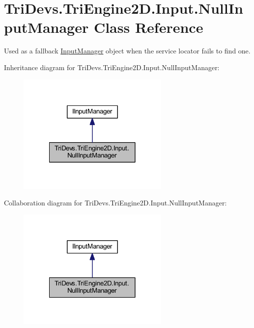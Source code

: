 \hypertarget{class_tri_devs_1_1_tri_engine2_d_1_1_input_1_1_null_input_manager}{\section{Tri\-Devs.\-Tri\-Engine2\-D.\-Input.\-Null\-Input\-Manager Class Reference}
\label{class_tri_devs_1_1_tri_engine2_d_1_1_input_1_1_null_input_manager}
}


Used as a fallback \hyperlink{class_tri_devs_1_1_tri_engine2_d_1_1_input_1_1_input_manager}{Input\-Manager} object when the service locator fails to find one.  




Inheritance diagram for Tri\-Devs.\-Tri\-Engine2\-D.\-Input.\-Null\-Input\-Manager\-:\nopagebreak
\begin{figure}[H]
\begin{center}
\leavevmode
\includegraphics[width=210pt]{class_tri_devs_1_1_tri_engine2_d_1_1_input_1_1_null_input_manager__inherit__graph}
\end{center}
\end{figure}


Collaboration diagram for Tri\-Devs.\-Tri\-Engine2\-D.\-Input.\-Null\-Input\-Manager\-:\nopagebreak
\begin{figure}[H]
\begin{center}
\leavevmode
\includegraphics[width=210pt]{class_tri_devs_1_1_tri_engine2_d_1_1_input_1_1_null_input_manager__coll__graph}
\end{center}
\end{figure}
